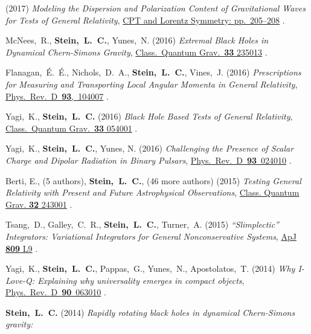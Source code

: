 \begin{etaremune}[start=\value{pubCounter}]
  (2017)
  {\it Modeling the Dispersion and Polarization Content of
    Gravitational Waves for Tests of General Relativity},
  \href{http://dx.doi.org/10.1142/9789813148505_0052}{CPT and Lorentz Symmetry: pp.~205--208}
  .
\item
  McNees,~R., {\bf Stein,~L.~C.}, Yunes,~N.
  (2016)
  {\it Extremal Black Holes in Dynamical Chern-Simons Gravity},
  \href{http://dx.doi.org/10.1088/0264-9381/33/23/235013}{Class.~Quantum Grav.~{\bf 33} 235013}
  .
\item
  Flanagan,~\'E.~\'E., Nichols,~D.~A., {\bf Stein,~L.~C.}, Vines,~J.
  (2016)
  {\it Prescriptions for Measuring and Transporting Local Angular
    Momenta in General Relativity},
  \href{http://dx.doi.org/10.1103/PhysRevD.93.104007}{Phys.~Rev.~D~{\bf 93},~104007}
  .
\item
  Yagi,~K., {\bf Stein,~L.~C.}
  (2016)
  {\it Black Hole Based Tests of General Relativity},
  \href{http://dx.doi.org/10.1088/0264-9381/33/5/054001}{Class.~Quantum Grav.~{\bf 33} 054001}
  .
\item
  Yagi,~K., {\bf Stein,~L.~C.}, Yunes, N.
  (2016)
  {\it Challenging the Presence of Scalar Charge and Dipolar Radiation
    in Binary Pulsars},
  \href{http://dx.doi.org/doi:10.1103/PhysRevD.93.024010}{Phys.~Rev.~D~{\bf 93}~024010}
  .
\item
  Berti, E., (5 authors), {\bf Stein,~L.~C.}, (46 more authors)
  (2015)
  {\it Testing General Relativity with Present and Future
    Astrophysical Observations},
  \href{http://dx.doi.org/10.1088/0264-9381/32/24/243001}{Class. Quantum Grav. {\bf 32} 243001}
  .
\item
  Tsang,~D., Galley,~C.~R., {\bf Stein,~L.~C.}, Turner,~A.
  (2015)
  {\it ``Slimplectic'' Integrators: Variational Integrators for General Nonconservative Systems},
  \href{http://dx.doi.org/10.1088/2041-8205/809/1/L9}{ApJ {\bf 809} L9}
  .
\item
  Yagi,~K., {\bf Stein,~L.~C.}, Pappas,~G., Yunes,~N., Apostolatos,~T.
  (2014)
  {\it Why I-Love-Q: Explaining why universality emerges in compact objects},
  \href{http://dx.doi.org/10.1103/PhysRevD.90.063010}{Phys.~Rev.~D~{\bf 90}~063010}
  .
\item
  {\bf Stein,~L.~C.}
  (2014)
  {\it Rapidly rotating black holes in dynamical Chern-Simons gravity:
}
\end{etaremune}
